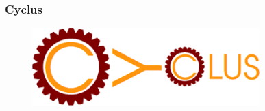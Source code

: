\begin{frame}
  \frametitle{Cyclus}
        \begin{center}
                \begin{figure}
                \begin{center}
                        \includegraphics[height=3cm]{./images/cyclus.png}
                \end{center}
                \caption{\cite{cyclus}}
                \label{fig:cyclus}
                \end{figure}
        \end{center}
\end{frame}
